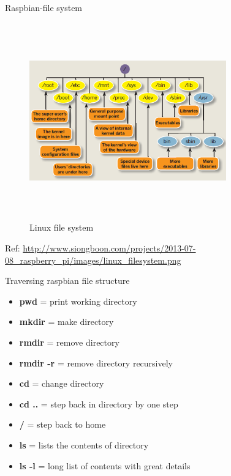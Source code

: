 \begin{frame}{Raspbian-file system}
	\begin{figure}
		\centering
		\includegraphics[width=8.5cm,height=8.5cm,keepaspectratio]{linux_filesystem}
		\caption{Linux file system}
	\end{figure}
	Ref: \url{http://www.siongboon.com/projects/2013-07-08_raspberry_pi/images/linux_filesystem.png}
\end{frame}
\begin{frame}{Traversing raspbian file structure}
	\begin{itemize}
		\item \textbf{pwd} = print working directory
		\item \textbf{mkdir} = make directory
		\item \textbf{rmdir} = remove directory
		\item \textbf{rmdir -r} = remove directory recursively
		\item \textbf{cd} = change directory
		\item \textbf{cd ..} = step back in directory by one step
		\item \textbf{/} = step back to home
		\item \textbf{ls} = lists the contents of directory
		\item \textbf{ls -l} = long list of contents with great details
	\end{itemize}
\end{frame}

